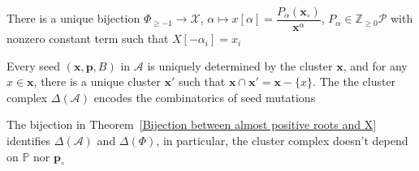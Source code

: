 \documentclass[main]{subfiles}
\begin{document}
\begin{theorem}\label{Bijection between almost positive roots and X}
There is a unique bijection $\Phi_{\geq-1}\to\mathcal X$, $\alpha\mapsto x[\alpha]=\dfrac{P_\alpha(\mathbf{x}_\circ)}{\mathbf x^\alpha}$, $P_\alpha\in\mathbb Z_{\geq0}\mathcal P$ with nonzero constant term such that $X[-\alpha_i]=x_i$
\end{theorem}

\begin{theorem}
Every seed $(\mathbf x,\mathbf p,B)$ in $\mathcal A$ is uniquely determined by the cluster $\mathbf x$, and for any $x\in \mathbf x$, there is a unique cluster $\mathbf x'$ such that $\mathbf x\cap\mathbf x'=\mathbf x-\{x\}$. The the cluster complex $\Delta(\mathcal A)$ encodes the combinatorics of seed mutations
\end{theorem}

\begin{theorem}
The bijection in Theorem~\ref{Bijection between almost positive roots and X} identifies $\Delta(\mathcal A)$ and $\Delta(\Phi)$, in particular, the cluster complex doesn't depend on $\mathbb P$ nor $\mathbf p_\circ$
\end{theorem}
\end{document}
